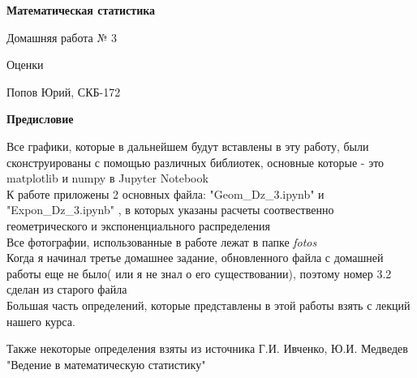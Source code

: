 \documentclass[a4paper,12pt, oneside]{book}
\begin{document}
	\pagestyle{plain}
	
	\begin{titlepage}	
		\begin{center}
			{\Huge \textbf{Математическая статистика}}
			\vspace{30mm}
			
			{\Huge Домашняя работа № 3 \\}
			\vspace{30mm}
			
			{\huge Оценки}
			\vspace{30mm}
			
			{\Large Попов Юрий, СКБ-172}
		\end{center}
	\end{titlepage}
	
	
	
\begin{spacing}{0.99}          
	\tableofcontents %
\end{spacing}

\newpage
\begin{center}
	{\Huge{\bf{Предисловие}}}
\end{center}




Все графики, которые в дальнейшем будут вставлены в эту работу, были сконструированы с помощью различных библиотек, основные которые - это matplotlib  и numpy в Jupyter Notebook\\

К работе приложены 2 основных файла: "Geom\_Dz\_3.ipynb" и "Expon\_Dz\_3.ipynb" , в которых указаны расчеты  соотвественно геометрического и  экспоненциального распределения\\

Все фотографии, использованные в работе лежат в папке {\it fotos}\\

Когда я начинал третье домашнее задание, обновленного файла с домашней работы еще не было( или я не знал о его существовании), поэтому номер 3.2 сделан из старого файла\\


Большая часть определений, которые представлены в этой работы взять с лекций нашего курса. 
\vspace{5mm}

Также некоторые определения взяты из источника   Г.И. Ивченко, Ю.И. Медведев \\
"Ведение в математическую статистику"
\end{document}
